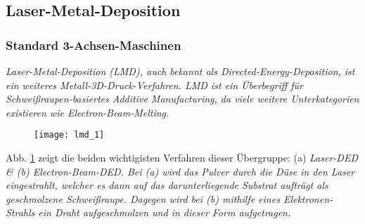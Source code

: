 \documentclass[../main.tex]{subfiles}
\begin{document}
\subsection{Laser-Metal-Deposition}
\subsubsection{Standard 3-Achsen-Maschinen}
\it{Laser-Metal-Deposition} (LMD), auch bekannt als \it{Directed-Energy-Deposition}, ist ein weiteres Metall-3D-Druck-Verfahren. LMD ist ein Überbegriff für Schweißraupen-basiertes \it{Additive Manufacturing}, da viele weitere Unterkategorien existieren wie \it{Electron-Beam-Melting}.
\begin{figure}[h]
	\begin{center}

		\texttt{[image: lmd\_1]}
\label{img:lmd_1}	
	\end{center}
\end{figure}
Abb. \ref{img:lmd_1} zeigt die beiden wichtigisten Verfahren dieser Übergruppe: (a) \it{Laser-DED} \& (b) \it{Electron-Beam-DED}.
Bei (a) wird das Pulver durch die Düse in den Laser eingestrahlt, welcher es dann auf das darunterliegende Substrat aufträgt als geschmolzene Schweißraupe. 
Dagegen wird bei (b) mithilfe eines Elektronen-Strahls ein Draht aufgeschmolzen und in dieser Form aufgetragen. \parencite{ALL3D_1}
\end{document}
